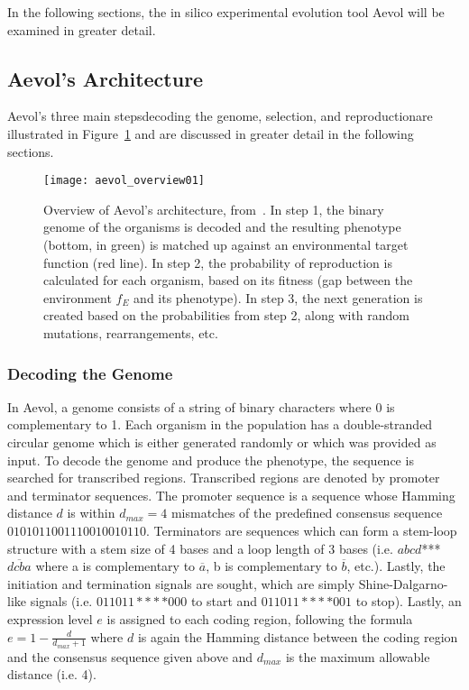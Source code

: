 In the following sections, the in silico experimental evolution tool Aevol will be examined in greater detail. 

\subsection{Aevol's Architecture}
Aevol's three main steps\textemdash decoding the genome, selection, and reproduction\textemdash are illustrated in Figure~\ref{fig:aevol_overview01} and are discussed in greater detail in the following sections. 

\begin{figure}[H]
	\texttt{[image: aevol\_overview01]}
	\centering
	\caption[Overview of Aevol's architecture.]{Overview of Aevol's architecture, from~\cite{Batut.2013}. In step 1, the binary genome of the organisms is decoded and the resulting phenotype (bottom, in green) is matched up against an environmental target function (red line). In step 2, the probability of reproduction is calculated for each organism, based on its fitness (gap between the environment $f_E$ and its phenotype). In step 3, the next generation is created based on the probabilities from step 2, along with random mutations, rearrangements, etc.}
	\label{fig:aevol_overview01}
\end{figure}
\subsubsection{Decoding the Genome}\label{subsec:aevol_decoding}
In Aevol, a genome consists of a string of binary characters where 0 is complementary to 1. Each organism in the population has a double-stranded circular genome which is either generated randomly or which was provided as input. To decode the genome and produce the phenotype, the sequence is searched for transcribed regions. Transcribed regions are denoted by promoter and terminator sequences. The promoter sequence is a sequence whose Hamming distance $d$ is within $d_{max} = 4$ mismatches of the predefined consensus sequence $0101011001110010010110$. Terminators are sequences which can form a stem-loop structure with a stem size of 4 bases and a loop length of 3 bases (i.e. $abcd$***$\overline{dcba}$ where a is complementary to $\overline{a}$, b is complementary to $\overline{b}$, etc.). Lastly, the initiation and termination signals are sought, which are simply Shine-Dalgarno-like signals (i.e. $011011****000$ to start and $011011****001$ to stop). Lastly, an expression level $e$ is assigned to each coding region, following the formula $e = 1 - \frac{d}{d_{max} + 1}$ where $d$ is again the Hamming distance between the coding region and the consensus sequence given above and $d_{max}$ is the maximum allowable distance (i.e. 4). 

